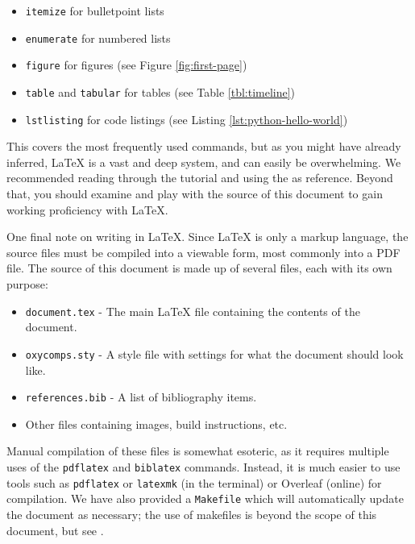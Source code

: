 \documentclass[10pt,twocolumn]{article}
\begin{document}
\begin{itemize}
    \item \texttt{itemize} for bulletpoint lists
    \item \texttt{enumerate} for numbered lists
    \item \texttt{figure} for figures (see Figure \ref{fig:first-page})
    \item \texttt{table} and \texttt{tabular} for tables (see Table \ref{tbl:timeline})
    \item \texttt{lstlisting} for code listings (see Listing \ref{lst:python-hello-world})
\end{itemize}



This covers the most frequently used commands, but as you might have already inferred, LaTeX is a vast and deep system, and can easily be overwhelming.
We recommended reading through the  tutorial \cite{Overleaf2021LearnLaTeXIn} and using the  \cite{WikiBook2022LaTeX} as reference.
Beyond that, you should examine and play with the source of this document to gain working proficiency with LaTeX.

One final note on writing in LaTeX.
Since LaTeX is only a markup language, the source files must be compiled into a viewable form, most commonly into a PDF file.
The source of this document is made up of several files, each with its own purpose:
\begin{itemize}
    \item \texttt{document.tex} - The main LaTeX file containing the contents of the document.
    \item \texttt{oxycomps.sty} - A style file with settings for what the document should look like.
    \item \texttt{references.bib} - A list of bibliography items.
    \item Other files containing images, build instructions, etc.
\end{itemize}
Manual compilation of these files is somewhat esoteric, as it requires multiple uses of the \texttt{pdflatex} and \texttt{biblatex} commands.
Instead, it is much easier to use tools such as \texttt{pdflatex} or \texttt{latexmk} (in the terminal) or Overleaf (online) for compilation.
We have also provided a \texttt{Makefile} which will automatically update the document as necessary; the use of makefiles is beyond the scope of this document, but see \textcite{Lambert2021MakefileTutorial}.
\end{document}
